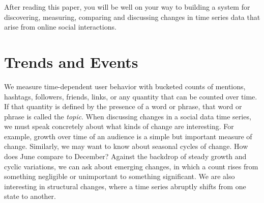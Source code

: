 \documentclass{article}
\begin{document}


After reading this paper, you will be well on your way to building a system for
discovering, measuring, comparing and discussing changes in time series data
that arise from online social interactions.

\section{Trends and Events}  \label{definitions}

We measure time-dependent user behavior with bucketed counts of mentions,
hashtags, followers, friends, links, or any quantity that can be counted over
time. If that quantity is defined by the presence of a word or phrase, that
word or phrase is called the \textit{topic}. When discussing changes in a
social data time series, we must speak concretely about what kinds of change
are interesting. For example, growth over time of an audience is a simple but
important measure of change. Similarly, we may want to know about seasonal
cycles of change. How does June compare to December? Against the backdrop of
steady growth and cyclic variations, we can ask about emerging changes, in
which a count rises from something negligible or unimportant to something
significant. We are also interesting in structural changes, where a time series
abruptly shifts from one state to another.
\end{document}
